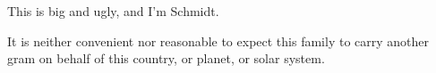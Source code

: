 

This is big and ugly, and I'm Schmidt.

It is neither convenient nor reasonable to expect this family to carry
another gram on behalf of this country, or planet, or solar system.

\bye
